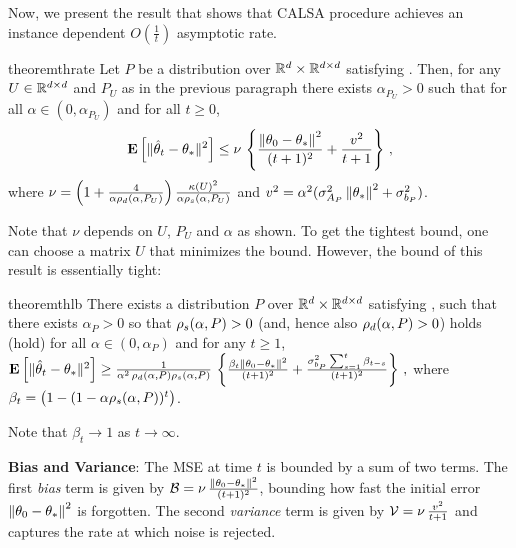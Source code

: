 Now, we present the result that shows that CALSA procedure achieves an instance dependent $O(\frac{1}{t})$ asymptotic rate.
\fi
\begin{restatable}{theorem}{thrate}\label{th:rate}
Let $P$ be a distribution over $\mathbb{R}^d\times \mathbb{R}^{d \times d}$ satisfying .
Then, for any $U\in\mathbb{R}^{d \times d}$ and $P_U$ as in the previous paragraph there exists
$\alpha_{P_U}>0$ such that 
for all $\alpha\in (0,\alpha_{P_U})$ and for all $t\ge 0$,
\begin{align*}
\mathbf{E}\left[\| \hat{\theta}_t-\theta_*\|^2\right]
\leq
\nu\,
\left\{\frac{\left\| \theta_0-\theta_*\right\|^2}{(t+1)^2}+ \frac{v^2}{t+1} \right\}\,,
\end{align*}
where $\nu = \left(1+\tfrac4{\alpha\rho_d(\alpha,P_U)}\right)\tfrac{\kappa(U)^2}{\alpha \rho_s(\alpha,P_U)}$ and
$v^2 = 
\alpha^2(\sigma_{A_P}^2\left\| \theta_*\right\|^2+\sigma_{b_P}^2)$.
\end{restatable}
Note that $\nu$ depends on $U$, $P_U$ and $\alpha$ as shown.
To get the tightest bound, one can choose a matrix $U$ that minimizes the bound. 
However, the bound of this result is essentially tight:
\begin{restatable}{theorem}{thlb}
\label{th:lb}
There exists a distribution $P$ over $\mathbb{R}^d\times \mathbb{R}^{d \times d}$ satisfying , such that
there exists $\alpha_P>0$ so that $\rho_s(\alpha,P)>0$ (and, hence also $\rho_d(\alpha,P)>0$) holds (hold) for all $\alpha\in (0,\alpha_P)$ and
for any $t\ge 1$,  $\mathbf{E}\left[\| \hat{\theta}_t-\theta_*\|^2\right] 
\geq \frac{1}{\alpha^2 \, \rho_d(\alpha,P)\rho_s(\alpha,P)} \,\left\{ \frac{\beta_t \left\| \theta_0-\theta_*\right\|^2}{(t+1)^2} 
+ \frac{\sigma^2_{b_P}\sum_{s=1}^t \beta_{t-s}  }{(t+1)^2} \right\}\,,$
where $\beta_{t} =  \big(1-(1-\alpha \rho_s(\alpha,P))^t\big)$.
\end{restatable}
Note that $\beta_t \to 1$ as $t\to\infty$. 

\textbf{Bias and Variance}: The MSE at time $t$ is bounded by a sum of two terms. The first \emph{bias} term is given by $\mathcal{B}=\nu \,\frac{\left\| \theta_0-\theta_*\right\|^2}{(t+1)^2}$, bounding how fast the initial error $\left\| \theta_0-\theta_*\right\|^2$ is forgotten. The second \emph{variance} term is given by $\mathcal{V}=\nu\, \frac{v^2}{t+1} $ and captures the rate at which noise is rejected. 

